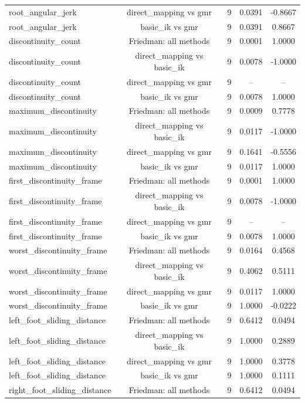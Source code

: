 \begin{table}[t]
{\begin{tabular}{lcccc}
root\_angular\_jerk & direct\_mapping vs gmr & 9 & 0.0391 & -0.8667 \\
root\_angular\_jerk & basic\_ik vs gmr & 9 & 0.0391 & 0.8667 \\
discontinuity\_count & Friedman: all methods & 9 & 0.0001 & 1.0000 \\
discontinuity\_count & direct\_mapping vs basic\_ik & 9 & 0.0078 & -1.0000 \\
discontinuity\_count & direct\_mapping vs gmr & 9 & -- & -- \\
discontinuity\_count & basic\_ik vs gmr & 9 & 0.0078 & 1.0000 \\
maximum\_discontinuity & Friedman: all methods & 9 & 0.0009 & 0.7778 \\
maximum\_discontinuity & direct\_mapping vs basic\_ik & 9 & 0.0117 & -1.0000 \\
maximum\_discontinuity & direct\_mapping vs gmr & 9 & 0.1641 & -0.5556 \\
maximum\_discontinuity & basic\_ik vs gmr & 9 & 0.0117 & 1.0000 \\
first\_discontinuity\_frame & Friedman: all methods & 9 & 0.0001 & 1.0000 \\
first\_discontinuity\_frame & direct\_mapping vs basic\_ik & 9 & 0.0078 & -1.0000 \\
first\_discontinuity\_frame & direct\_mapping vs gmr & 9 & -- & -- \\
first\_discontinuity\_frame & basic\_ik vs gmr & 9 & 0.0078 & 1.0000 \\
worst\_discontinuity\_frame & Friedman: all methods & 9 & 0.0164 & 0.4568 \\
worst\_discontinuity\_frame & direct\_mapping vs basic\_ik & 9 & 0.4062 & 0.5111 \\
worst\_discontinuity\_frame & direct\_mapping vs gmr & 9 & 0.0117 & 1.0000 \\
worst\_discontinuity\_frame & basic\_ik vs gmr & 9 & 1.0000 & -0.0222 \\
left\_foot\_sliding\_distance & Friedman: all methods & 9 & 0.6412 & 0.0494 \\
left\_foot\_sliding\_distance & direct\_mapping vs basic\_ik & 9 & 1.0000 & 0.2889 \\
left\_foot\_sliding\_distance & direct\_mapping vs gmr & 9 & 1.0000 & 0.3778 \\
left\_foot\_sliding\_distance & basic\_ik vs gmr & 9 & 1.0000 & 0.1111 \\
right\_foot\_sliding\_distance & Friedman: all methods & 9 & 0.6412 & 0.0494 \\

\end{tabular}}
\end{table}
